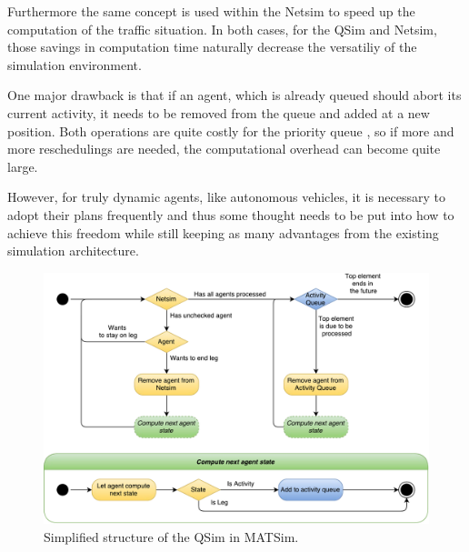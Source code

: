 Furthermore the same concept is used within the Netsim to speed up the computation
of the traffic situation. In both cases, for the QSim and Netsim, those savings in
computation time naturally decrease the versatiliy of the simulation environment.

One major drawback is that if an agent, which is already queued should abort its
current activity, it needs to be removed from the queue and added at a new position.
Both operations are quite costly for the priority queue \citep{JavaPQ}, so
if more and more reschedulings are needed, the computational overhead can become
quite large.

However, for truly dynamic agents, like autonomous vehicles, it is necessary to
adopt their plans frequently and thus some thought needs to be put into how to
achieve this freedom while still keeping as many advantages from the existing
simulation architecture.

\begin{figure}
    \centering
    \includegraphics[width=1.0\textwidth]{figures/qsim.pdf}
    \caption{Simplified structure of the QSim in MATSim.}
    \label{fig:qsim}
\end{figure}
